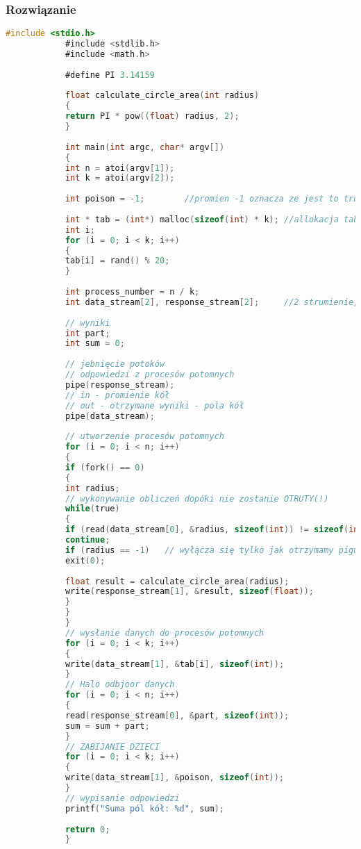 		\subsubsection{Rozwiązanie}
			\begin{lstlisting}[language=C]
			#include <stdio.h>
			#include <stdlib.h>
			#include <math.h>
			
			#define PI 3.14159
			
			float calculate_circle_area(int radius)
			{
			return PI * pow((float) radius, 2);
			}
			
			int main(int argc, char* argv[])
			{
			int n = atoi(argv[1]);
			int k = atoi(argv[2]);
			
			int poison = -1;		//promien -1 oznacza ze jest to trujaca pigulka zabijajaca proces potomny
			
			int * tab = (int*) malloc(sizeof(int) * k);	//allokacja tablicy k liczb (promieni)
			int i;
			for (i = 0; i < k; i++)
			{
			tab[i] = rand() % 20;
			}
			
			int process_number = n / k;
			int data_stream[2], response_stream[2];		//2 strumienie, jeden do wysyłania danych, drugi do odbioru odpowiedzi
			
			// wyniki
			int part;
			int sum = 0;
			
			// jebnięcie potoków
			// odpowiedzi z procesów potomnych
			pipe(response_stream);
			// in - promienie kół
			// out - otrzymane wyniki - pola kół
			pipe(data_stream);
			
			// utworzenie procesów potomnych
			for (i = 0; i < n; i++)
			{
			if (fork() == 0)
			{
			int radius;
			// wykonywanie obliczeń dopóki nie zostanie OTRUTY(!)
			while(true)
			{
			if (read(data_stream[0], &radius, sizeof(int)) != sizeof(int))
			continue;
			if (radius == -1)	// wyłącza się tylko jak otrzymamy pigułkę
			exit(0);
			
			float result = calculate_circle_area(radius);
			write(response_stream[1], &result, sizeof(float));
			}
			}
			}
			// wysłanie danych do procesów potomnych
			for (i = 0; i < k; i++)
			{
			write(data_stream[1], &tab[i], sizeof(int));
			}
			// Halo odbjoor danych
			for (i = 0; i < n; i++)
			{
			read(response_stream[0], &part, sizeof(int));
			sum = sum + part;
			}
			// ZABIJANIE DZIECI
			for (i = 0; i < k; i++)
			{
			write(data_stream[1], &poison, sizeof(int));
			}
			// wypisanie odpowiedzi
			printf("Suma pól kół: %d", sum);
			
			return 0;
			}
			
			\end{lstlisting}
		\newpage